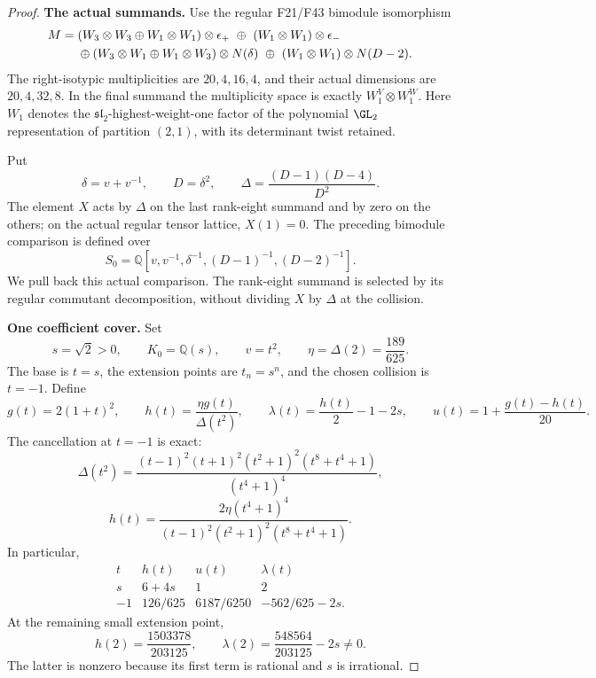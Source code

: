 \documentclass[11pt,a4paper]{article}
\newcommand{\Q}{\mathbb Q}\newcommand{\Z}{\mathbb Z}\newcommand{\C}{\mathbb C}\newcommand{\N}{\mathbb N}\newcommand{\F}{\mathbb F}
\newcommand{\fid}[1]{\textsf{#1}}\newcommand{\gate}[1]{\textsf{#1}}
\theoremstyle{named}\newtheorem{finding}{Finding}[section]
\theoremstyle{definition}\newtheorem{definition}[finding]{Definition}
\theoremstyle{remark}\newtheorem{remark}[finding]{Remark}
\begin{document}
\begin{proof}
\par\smallskip\noindent\textbf{The actual summands.}\quad
Use the regular \fid{F21}/\fid{F43} bimodule isomorphism
\begin{align}
 M={}&(W_3\otimes W_3\oplus W_1\otimes W_1)
                          \otimes\epsilon_+
       \ \oplus\ (W_1\otimes W_1)\otimes\epsilon_-
       \notag\\
 &\oplus(W_3\otimes W_1\oplus W_1\otimes W_3)
                          \otimes N(\delta)
       \ \oplus\ (W_1\otimes W_1)\otimes N(D-2).
 \label{eq:fractionalactualmodule}
\end{align}
The right-isotypic multiplicities are $20,4,16,4$,
and their actual dimensions are $20,4,32,8$.
In the final summand the multiplicity space is exactly
$W_1^V\otimes W_1^W$.
Here $W_1$ denotes the $\mathfrak{sl}_2$-highest-weight-one
factor of the polynomial $\GL_2$ representation of
partition $(2,1)$, with its determinant twist retained.

Put
\[
 \delta=v+v^{-1},\qquad D=\delta^2,\qquad
 \Delta=\frac{(D-1)(D-4)}{D^2}.
\]
The element $X$ acts by $\Delta$ on the last rank-eight
summand and by zero on the others; on the actual regular
tensor lattice, $X(1)=0$.
The preceding bimodule comparison is defined over
\[
 S_0=\Q[v,v^{-1},\delta^{-1},(D-1)^{-1},(D-2)^{-1}].
\]
We pull back this actual comparison.
The rank-eight summand is selected by its regular
commutant decomposition, without dividing $X$ by
$\Delta$ at the collision.

\par\smallskip\noindent\textbf{One coefficient cover.}\quad
Set
\[
 s=\sqrt2>0,\qquad K_0=\Q(s),\qquad v=t^2,\qquad
 \eta=\Delta(2)=\frac{189}{625}.
\]
The base is $t=s$, the extension points are $t_n=s^n$,
and the chosen collision is $t=-1$.
Define
\begin{equation}\label{eq:fractionalfunctions}
 g(t)=2(1+t)^2,\qquad
 h(t)=\frac{\eta g(t)}{\Delta(t^2)},\qquad
 \lambda(t)=\frac{h(t)}2-1-2s,\qquad
 u(t)=1+\frac{g(t)-h(t)}{20}.
\end{equation}
The cancellation at $t=-1$ is exact:
\[
 \Delta(t^2)=
 \frac{(t-1)^2(t+1)^2(t^2+1)^2(t^8+t^4+1)}
      {(t^4+1)^4},
\]
\begin{equation}\label{eq:fractionalhcancellation}
 h(t)=\frac{2\eta(t^4+1)^4}
 {(t-1)^2(t^2+1)^2(t^8+t^4+1)}.
\end{equation}
In particular,
\[
\begin{array}{c|ccc}
 t&h(t)&u(t)&\lambda(t)\\ \hline
 s&6+4s&1&2\\
 -1&126/625&6187/6250&-562/625-2s .
\end{array}
\]
At the remaining small extension point,
\[
 h(2)=\frac{1503378}{203125},\qquad
 \lambda(2)=\frac{548564}{203125}-2s\ne0.
\]
The latter is nonzero because its first term is rational
and $s$ is irrational.


\end{proof}
\end{document}
